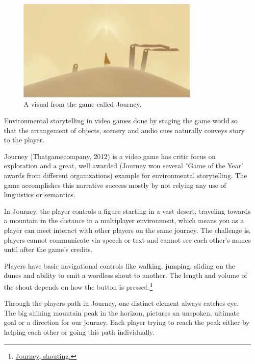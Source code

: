             \begin{figure}[H]
                \centering
                \includegraphics[width=0.8\textwidth]{images/journey.jpg}
                \caption{A visual from the game called Journey.}
                \label{fig:JOURNEY}
            \end{figure}

            Environmental storytelling in video games done by staging the game world so that the arrangement of objects, scenery and audio cues naturally conveys story to the player\cite{BioShock_Infinite}.\par

            Journey (Thatgamecompany, 2012) is a video game has critic focus on exploration and a great, well awarded (Journey won several "Game of the Year" awards from different organizations) example for environmental storytelling. The game accomplishes this narrative success mostly by not relying any use of linguistics or semantics.\par

            In Journey, the player controls a figure starting in a vast desert, traveling towards a mountain in the distance in a multiplayer environment, which means you as a player can meet interact with other players on the same journey. The challenge is, players cannot communicate via speech or text and cannot see each other's names until after the game's credits.\par

            Players have basic navigational controls like walking, jumping, sliding on the dunes and ability to emit a wordless shout to another. The length and volume of the shout depends on how the button is pressed.\footnote{\href{https://youtube.com/clip/UgkxMXBXc4aZmHuOL2f3PUoEVQ57Og5Suyks/}{Journey, shouting.}}\par

            Through the players path in Journey, one distinct element always catches eye. The big shining mountain peak in the horizon, pictures an unspoken, ultimate goal or a direction for our journey. Each player trying to reach the peak either by helping each other or going this path individually.\par

